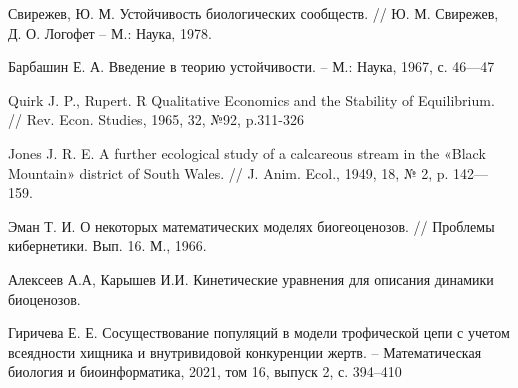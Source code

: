 \renewcommand{\refname}{\centering Список литературы}
\begin{thebibliography}{100}
    
        Свирежев, Ю. М. Устойчивость биологических сообществ. // Ю. М. Свирежев, Д. О. Логофет -- М.: Наука, 1978.

        Барбашин Е. А. Введение в теорию устойчивости. -- М.: Наука, 1967, с. 46—47

        Quirk J. P., Rupert. R Qualitative Economics and the Stability of Equilibrium. // Rev. Econ. Studies, 1965, 32, №92, p.311-326

        Jones J. R. E. A further ecological study of a calcareous stream in the «Black Mountain» district of South Wales. // J. Anim. Ecol., 1949, 18, № 2, p. 142—159.

        Эман Т. И. О некоторых математических моделях биогеоценозов. // Проблемы кибернетики. Вып. 16. М., 1966.

        Алексеев А.А, Карышев И.И. Кинетические уравнения для описания динамики биоценозов.
        
        Гиричева Е. Е. Сосуществование популяций в модели трофической цепи с учетом всеядности хищника и внутривидовой конкуренции жертв. -- Математическая биология и биоинформатика, 2021, том 16, выпуск 2, с. 394--410


\end{thebibliography}
